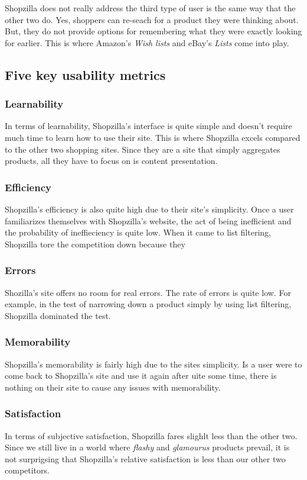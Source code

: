 \documentclass[11pt, oneside]{article}
\begin{document}
Shopzilla does not really address the third type of user is the same way that the other two do. Yes, shoppers can re-seach for a product they were thinking about. But, they do not provide options for remembering what they were exactly looking for earlier. This is where Amazon's \textit{Wish lists} and eBay's \textit{Lists} come into play.

\subsection{Five key usability metrics}
\subsubsection{Learnability}
In terms of learnability, Shopzilla's interface is quite simple and doesn't require much time to learn how to use their site. This is where Shopzilla excels compared to the other two shopping sites. Since they are a site that simply aggregates products, all they have to focus on is content presentation. 

\subsubsection{Efficiency}
Shopzilla's efficiency is also quite high due to their site's simplicity. Once a user familiarizes themselves with Shopzilla's website, the act of being inefficient and the probability of ineffieciency is quite low. When it came to list filtering, Shopzilla tore the competition down because they 

\subsubsection{Errors}
Shozilla's site offers no room for real errors. The rate of errors is quite low. For example, in the test of narrowing down a product simply by using list filtering, Shopzilla dominated the test. 


\subsubsection{Memorability}
Shopzilla's memorability is fairly high due to the sites simplicity. Is a user were to come back to Shopzilla's site and use it again after uite some time, there is nothing on their site to cause any issues with memorability. 


\subsubsection{Satisfaction}
In terms of subjective satisfaction, Shopzilla fares slighlt less than the other two. Since we still live in a world where \textit{flashy} and \textit{glamourus} products prevail, it is not surprigsing that Shopzilla's relative satisfaction is less than our other two competitors.
\end{document}

